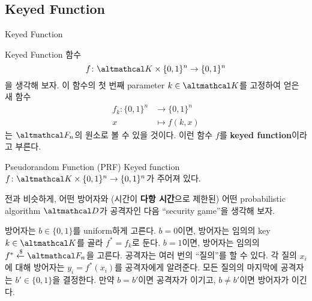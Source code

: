 \documentclass[../250428_msquare_provable_security.tex]{subfiles}
\begin{document}
\subsection{Keyed Function}

\begin{frame}{Keyed Function}
    \begin{block}{Keyed Function}
        함수
        \[
            f \colon \mcal{K} \times \{0,1\}^n \to \{0,1\}^n
        \]
        을 생각해 보자.\pause
        이 함수의 첫 번째 parameter \(k \in \mcal{K}\)를 고정하여 얻은 새 함수
        \begin{align*}
                f_k\colon \{0,1\}^n &\longrightarrow \{0,1\}^n \\
                x&\longmapsto f(k, x)
        \end{align*}
        는 \(\mcal{F}_n\)의 원소로 볼 수 있을 것이다.
        \pause
        이런 함수 \(f\)를 \textbf{keyed function}이라고 부른다.
    \end{block}
\end{frame}

\begin{frame}{Pseudorandom Function (PRF)}
    Keyed function \(f \colon \mcal{K} \times \{0,1\}^n \to \{0,1\}^n\)가 주어져 있다.

    전과 비슷하게, 어떤 방어자와 (시간이 \textbf{다항 시간}으로 제한된) 어떤 probabilistic algorithm \(\mcal{D}\)가 공격자인
    다음 ``security game''을 생각해 보자.
    \pause
    \begin{enumerate}
        \ii
        방어자는 \(b \in \{0,1\}\)를 uniform하게 고른다.
        \pause
        \ii
        \(b = 0\)이면, 방어자는
        임의의 key \(k \in \mcal{K}\)를 골라 \(f^\ast = f_k\)로 둔다.
        \ii
        \(b = 1\)이면, 방어자는 임의의 \(f^\ast \dgets \mcal{F}_n\)을 고른다.
        \pause
        \ii
        공격자는 여러 번의 ``질의''를 할 수 있다.
        각 질의 \(x_i\)에 대해 방어자는 \(y_i = f^\ast(x_i)\)를 공격자에게 알려준다.
        \pause
        \ii
        모든 질의의 마지막에 공격자는 \(b' \in \{0,1\}\)을 결정한다.
        만약 \(b = b'\)이면 공격자가 이기고, \(b \neq b'\)이면 방어자가 이긴다.
    \end{enumerate}
\end{frame}
\end{document}
